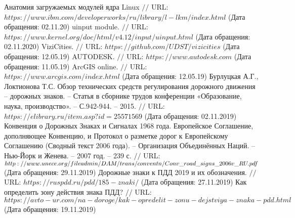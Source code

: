 \makeatletter \renewcommand{} \makeatother
\renewcommand\refname{Список использованных источников}
\begin{thebibliography}{00}
	
	Анатомия загружаемых модулей ядра Linux $//$ URL: $https://www.ibm.com/developerworks/ru/library/l-lkm/index.html$ (Дата обращения: 02.11.20)
	uinput module. $//$ URL: $https://www.kernel.org/doc/html/v4.12/input/uinput.html$ (Дата обращения: 02.11.2020)
	ViziCities. $//$ URL: $https://github.com/UDST/vizicities$ (Дата обращения: 12.05.19)
	AUTODESK. $//$ URL: $https://www.autodesk.com$ (Дата обращения: 11.05.19)
	ArcGIS online. $//$ URL: $https://www.arcgis.com/index.html$ (Дата обращения: 12.05.19)
	Бурлуцкая А.Г., Локтионова Т.С. Обзор технических средств регулирования дорожного движения -- дорожных знаков. -- Статья в сборнике трудов конференции «Образование, наука, производство». -- С.942-944. -- 2015. $//$ URL: $https://elibrary.ru/item.asp?id=25571569$ (Дата обращения: 02.11.2019)
	Конвенция о Дорожных Знаках и Сигналах 1968 года. Европейское Соглашение, дополняющее Конвенцию, и Протокол о разметке дорог к Европейскому Соглашению (Сводный текст 2006 года). -- Организация Объединённых Наций. -- Нью-Йорк и Женева. -- 2007 год. -- 239 с. $//$ URL: $http://www.unece.org/fileadmin/DAM/trans/conventn/Conv\_road\_\\
	signs\_2006v\_RU.pdf$ (Дата обращения: 29.11.2019)
	Дорожные знаки к ПДД 2019 и их обозначения. $//$ URL: $https://ruspdd.ru/pdd/185-znaki/$ (Дата обращения: 27.11.2019)
	Как определить зону действия знака ПДД? $//$ URL: $https://avto-ur.com/na-doroge/kak-opredelit-zonu-dejstviya-znaka-pdd.html$ (Дата обращения: 19.11.2019)
\end{thebibliography}
